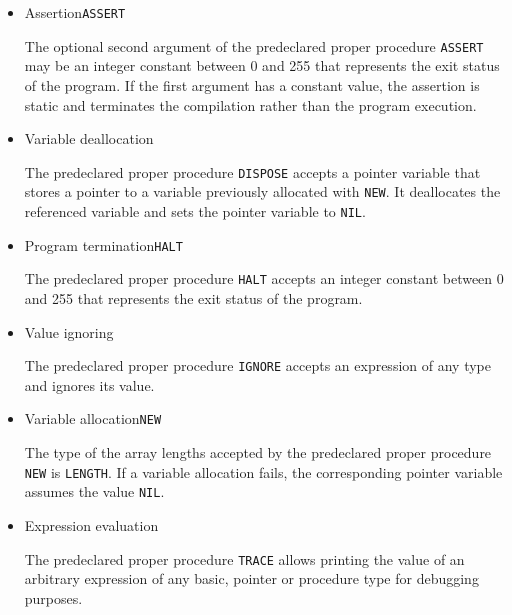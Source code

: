 \begin{itemize}

\item Assertion\alignright\texttt{ASSERT}\nopagebreak

The optional second argument of the predeclared proper procedure \texttt{ASSERT} may be an integer constant between 0 and 255 that represents the exit status of the program.
If the first argument has a constant value, the assertion is static and terminates the compilation rather than the program execution.

\item Variable deallocation\alignright\texttt{}\nopagebreak

The predeclared proper procedure \texttt{DISPOSE} accepts a pointer variable that stores a pointer to a variable previously allocated with \texttt{NEW}.
It deallocates the referenced variable and sets the pointer variable to \texttt{NIL}.

\item Program termination\alignright\texttt{HALT}\nopagebreak

The predeclared proper procedure \texttt{HALT} accepts an integer constant between 0 and 255 that represents the exit status of the program.

\item Value ignoring\alignright\texttt{}\nopagebreak

The predeclared proper procedure \texttt{IGNORE} accepts an expression of any type and ignores its value.

\item Variable allocation\alignright\texttt{NEW}\nopagebreak

The type of the array lengths accepted by the predeclared proper procedure \texttt{NEW} is \texttt{LENGTH}.
If a variable allocation fails, the corresponding pointer variable assumes the value \texttt{NIL}.

\item Expression evaluation\alignright\texttt{}\nopagebreak

The predeclared proper procedure \texttt{TRACE} allows printing the value of an arbitrary expression of any basic, pointer or procedure type for debugging purposes.

\end{itemize}


